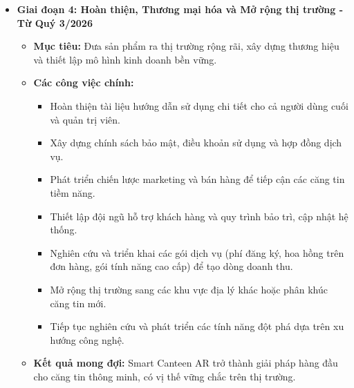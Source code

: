 \documentclass[12pt,a4paper]{article}
\begin{document}
\begin{itemize}[label=\textbullet]
    \item \textbf{Giai đoạn 4: Hoàn thiện, Thương mại hóa và Mở rộng thị trường - Từ Quý 3/2026}
    \begin{itemize}[label=\textbullet]
        \item \textbf{Mục tiêu:} Đưa sản phẩm ra thị trường rộng rãi, xây dựng thương hiệu và thiết lập mô hình kinh doanh bền vững.
        \item \textbf{Các công việc chính:}
        \begin{itemize}[label=\textrightarrow]
            \item Hoàn thiện tài liệu hướng dẫn sử dụng chi tiết cho cả người dùng cuối và quản trị viên.
            \item Xây dựng chính sách bảo mật, điều khoản sử dụng và hợp đồng dịch vụ.
            \item Phát triển chiến lược marketing và bán hàng để tiếp cận các căng tin tiềm năng.
            \item Thiết lập đội ngũ hỗ trợ khách hàng và quy trình bảo trì, cập nhật hệ thống.
            \item Nghiên cứu và triển khai các gói dịch vụ (phí đăng ký, hoa hồng trên đơn hàng, gói tính năng cao cấp) để tạo dòng doanh thu.
            \item Mở rộng thị trường sang các khu vực địa lý khác hoặc phân khúc căng tin mới.
            \item Tiếp tục nghiên cứu và phát triển các tính năng đột phá dựa trên xu hướng công nghệ.
        \end{itemize}
        \item \textbf{Kết quả mong đợi:} Smart Canteen AR trở thành giải pháp hàng đầu cho căng tin thông minh, có vị thế vững chắc trên thị trường.
    \end{itemize}
\end{itemize}
\end{document}
